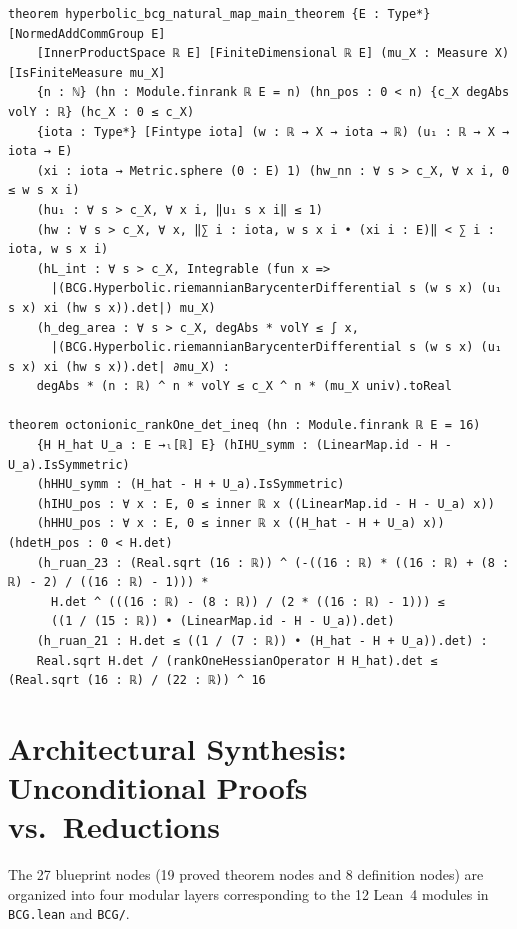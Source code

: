 \documentclass[10pt]{article}
\renewcommand{\_}{\origus\allowbreak}
\newcommand{\code}[1]{\texttt{#1}}
\newcommand{\NModules}{12}
\newcommand{\NTotalNodes}{27}
\newcommand{\NProvedNodes}{19}
\newcommand{\NDefNodes}{8}
\begin{document}
\begin{lstlisting}[caption={Master theorem signatures in \code{BCG/MainTheorem.lean} and \code{BCG/RankOne/OctonionicCase.lean}.}]
theorem hyperbolic_bcg_natural_map_main_theorem {E : Type*} [NormedAddCommGroup E]
    [InnerProductSpace ℝ E] [FiniteDimensional ℝ E] (mu_X : Measure X) [IsFiniteMeasure mu_X]
    {n : ℕ} (hn : Module.finrank ℝ E = n) (hn_pos : 0 < n) {c_X degAbs volY : ℝ} (hc_X : 0 ≤ c_X)
    {iota : Type*} [Fintype iota] (w : ℝ → X → iota → ℝ) (u₁ : ℝ → X → iota → E)
    (xi : iota → Metric.sphere (0 : E) 1) (hw_nn : ∀ s > c_X, ∀ x i, 0 ≤ w s x i)
    (hu₁ : ∀ s > c_X, ∀ x i, ‖u₁ s x i‖ ≤ 1)
    (hw : ∀ s > c_X, ∀ x, ‖∑ i : iota, w s x i • (xi i : E)‖ < ∑ i : iota, w s x i)
    (hL_int : ∀ s > c_X, Integrable (fun x =>
      |(BCG.Hyperbolic.riemannianBarycenterDifferential s (w s x) (u₁ s x) xi (hw s x)).det|) mu_X)
    (h_deg_area : ∀ s > c_X, degAbs * volY ≤ ∫ x,
      |(BCG.Hyperbolic.riemannianBarycenterDifferential s (w s x) (u₁ s x) xi (hw s x)).det| ∂mu_X) :
    degAbs * (n : ℝ) ^ n * volY ≤ c_X ^ n * (mu_X univ).toReal

theorem octonionic_rankOne_det_ineq (hn : Module.finrank ℝ E = 16)
    {H H_hat U_a : E →ₗ[ℝ] E} (hIHU_symm : (LinearMap.id - H - U_a).IsSymmetric)
    (hHHU_symm : (H_hat - H + U_a).IsSymmetric)
    (hIHU_pos : ∀ x : E, 0 ≤ inner ℝ x ((LinearMap.id - H - U_a) x))
    (hHHU_pos : ∀ x : E, 0 ≤ inner ℝ x ((H_hat - H + U_a) x)) (hdetH_pos : 0 < H.det)
    (h_ruan_23 : (Real.sqrt (16 : ℝ)) ^ (-((16 : ℝ) * ((16 : ℝ) + (8 : ℝ) - 2) / ((16 : ℝ) - 1))) *
      H.det ^ (((16 : ℝ) - (8 : ℝ)) / (2 * ((16 : ℝ) - 1))) ≤
      ((1 / (15 : ℝ)) • (LinearMap.id - H - U_a)).det)
    (h_ruan_21 : H.det ≤ ((1 / (7 : ℝ)) • (H_hat - H + U_a)).det) :
    Real.sqrt H.det / (rankOneHessianOperator H H_hat).det ≤ (Real.sqrt (16 : ℝ) / (22 : ℝ)) ^ 16
\end{lstlisting}

\section{Architectural Synthesis: Unconditional Proofs vs.\ Reductions}

The \NTotalNodes{} blueprint nodes (\NProvedNodes{} proved theorem nodes and \NDefNodes{} definition
nodes) are organized into four modular layers corresponding to the \NModules{} Lean~4 modules in \code{BCG.lean} and \code{BCG/}.
\end{document}
